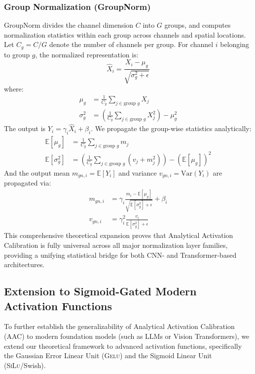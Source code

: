 \documentclass{article}
\theoremstyle{plain}
\theoremstyle{definition}
\theoremstyle{remark}
\begin{document}
\subsubsection{Group Normalization (GroupNorm)}
GroupNorm divides the channel dimension $C$ into $G$ groups, and computes normalization statistics within each group across channels and spatial locations. Let $C_g = C/G$ denote the number of channels per group. For channel $i$ belonging to group $g$, the normalized representation is:
\begin{equation}
    \hat{X}_i = \frac{X_i - \mu_g}{\sqrt{\sigma_g^2 + \epsilon}}
\end{equation}
where:
\begin{align}
    \mu_g &= \frac{1}{C_g} \sum_{j \in \text{group } g} X_j \\
    \sigma_g^2 &= \left( \frac{1}{C_g} \sum_{j \in \text{group } g} X_j^2 \right) - \mu_g^2
\end{align}
The output is $Y_i = \gamma_i \hat{X}_i + \beta_i$. We propagate the group-wise statistics analytically:
\begin{align}
    \mathbb{E}[\mu_g] &= \frac{1}{C_g} \sum_{j \in \text{group } g} m_j \\
    \mathbb{E}[\sigma_g^2] &= \left( \frac{1}{C_g} \sum_{j \in \text{group } g} (v_j + m_j^2) \right) - (\mathbb{E}[\mu_g])^2
\end{align}
And the output mean $m_{gn, i} = \mathbb{E}[Y_i]$ and variance $v_{gn, i} = \text{Var}(Y_i)$ are propagated via:
\begin{align}
    m_{gn, i} &= \gamma_i \frac{m_i - \mathbb{E}[\mu_g]}{\sqrt{\mathbb{E}[\sigma_g^2] + \epsilon}} + \beta_i \\
    v_{gn, i} &= \gamma_i^2 \frac{v_i}{\mathbb{E}[\sigma_g^2] + \epsilon}
\end{align}
This comprehensive theoretical expansion proves that Analytical Activation Calibration is fully universal across all major normalization layer families, providing a unifying statistical bridge for both CNN- and Transformer-based architectures.
\fi

\subsection{Extension to Sigmoid-Gated Modern Activation Functions}
\label{sec:modern_activations}

To further establish the generalizability of Analytical Activation Calibration (AAC) to modern foundation models (such as LLMs or Vision Transformers), we extend our theoretical framework to advanced activation functions, specifically the Gaussian Error Linear Unit (\textsc{Gelu}) and the Sigmoid Linear Unit (\textsc{SiLu}/Swish). 
\end{document}
